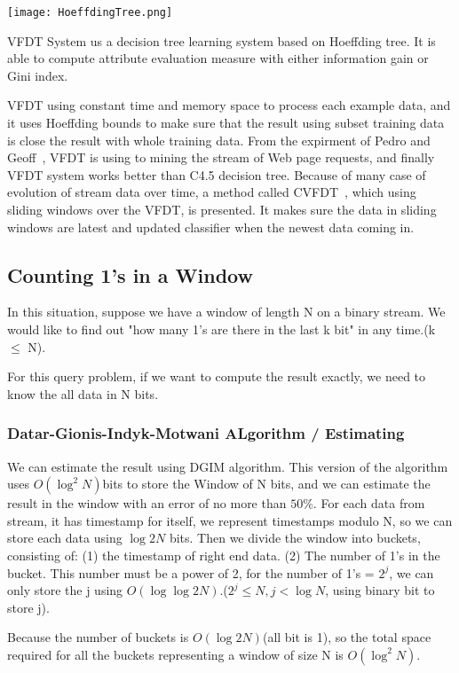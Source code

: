 \documentclass{report}
\begin{document}
\texttt{[image: HoeffdingTree.png]}

VFDT System us a decision tree learning system based on Hoeffding tree. It is able to compute attribute evaluation measure with either information gain or Gini index. 

VFDT using constant time and memory space to process each example data, and it uses Hoeffding bounds to make sure that the result using subset training data is close the result with whole training data. From the expirment of Pedro and Geoff~\cite{domingos2000mining}, VFDT is using to mining the stream of Web page requests, and finally VFDT system works better than C4.5 decision tree.
Because of many case of evolution of stream data over time, a method called CVFDT~\cite{jin2003efficient}, which using sliding windows over the VFDT, is presented. It makes sure the data in sliding windows are latest and updated classifier when the newest data coming in.


\subsection{ Counting 1's in a Window}
In this situation, suppose we have a window of length N on a binary stream. We would like to find out "how many 1's are there in the last k bit" in any time.(k $\leq$ N).

For this query problem, if we want to compute the result exactly, we need to know the all data in N bits.

\subsubsection{Datar-Gionis-Indyk-Motwani ALgorithm / Estimating}
We can estimate the result using DGIM algorithm. This version of the algorithm uses $O(\log^2{N})$bits to store the Window of N bits, and we can estimate the result in the window with an error of no more than $50\%$.
For each data from stream, it has timestamp for itself, we represent timestamps modulo N, so we can store each data using $\log{2}{N}$ bits. Then we divide the window into buckets, consisting of: (1) the timestamp of right end data. (2) The number of 1's in the bucket. This number must be a power of 2, for the number of 1's = $2^j$, we can only store the j using $O(\log\log{2}{N})$.($2^j\leq N , j< \log N$, using binary bit to store j).

Because the number of buckets is $O(\log{2}{N})$(all bit is 1), so the total space required for all the buckets representing a window of size N is $O(\log^2{N})$.
\end{document}
